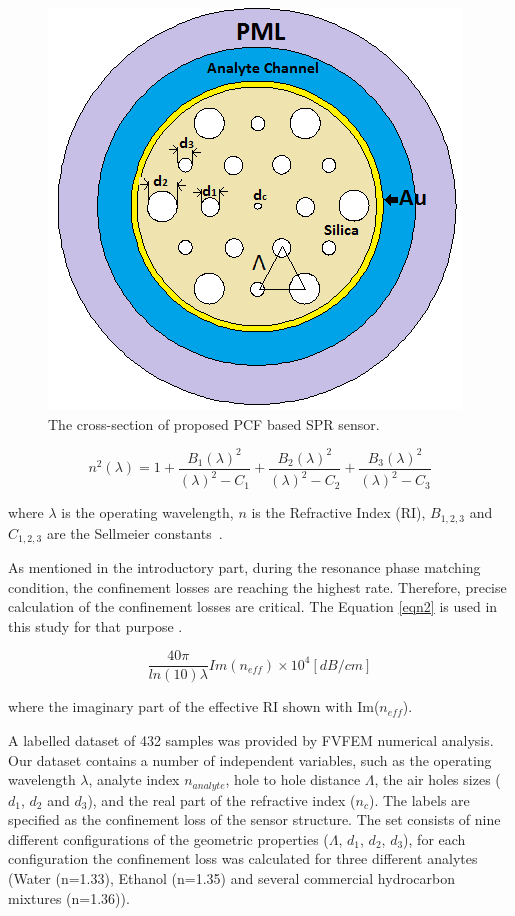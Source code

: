 \documentclass[journal]{IEEEtran}
\begin{document}
\begin{figure}[]
	\centering
	\includegraphics[width=.7\linewidth]{figures/Figx}
	\caption{The cross-section of proposed  PCF based SPR sensor.}
	\label{Figx}
\end{figure}




\begin{equation}
n^2(\lambda)=1+\frac{ B_1 (\lambda)^2} {(\lambda)^2-C_1} + \frac{ B_2 (\lambda)^2} {(\lambda)^2-C_2} + \frac{ B_3 (\lambda)^2} {(\lambda)^2-C_3}
\label{eqn1}
\end{equation}

where $\lambda$ is the operating wavelength, $n$ is the Refractive Index (RI), $B_{1,2,3}$ and  $C_{1,2,3}$ are the  Sellmeier constants~\cite{bjarklev2003PCF}.

As mentioned in the introductory part, during the resonance phase matching condition, the confinement losses are reaching the highest rate. Therefore, precise calculation of the confinement losses are critical. The Equation \ref{eqn2} is used in this study for that purpose \cite{yasli2019effect}.



\begin{equation}
\frac{40\pi}{ln(10) \lambda} Im(n_{eff}) \times 10^{4} [dB/cm]
\label{eqn2}
\end{equation}

where the imaginary part of the effective RI shown with Im($n_{eff}$).

A labelled dataset of 432 samples was provided by FVFEM numerical analysis. Our dataset contains a number of independent variables, such as the operating wavelength  $\lambda$, analyte index $n_{analyte}$, hole to hole distance $\Lambda$, the air holes sizes ($d_1$, $d_2$ and $d_3$), and the real part of the refractive index ($n_c$). The labels are specified as the confinement loss of the sensor structure. The set consists of nine different configurations of the geometric properties ($\Lambda$, $d_1$, $d_2$, $d_3$), for each configuration the confinement loss was calculated for three different analytes (Water (n=1.33), Ethanol (n=1.35) and several commercial hydrocarbon mixtures (n=1.36)).
\end{document}
